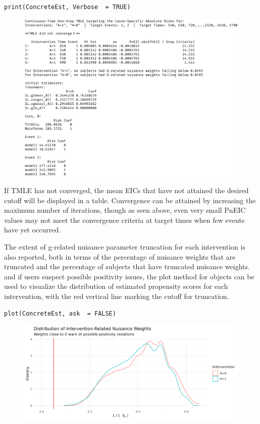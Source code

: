 \documentclass{report}
\newcommand{\1}{\ensuremath{\mathbf{1}}}
\begin{document}
\begin{lstlisting}
print(ConcreteEst, Verbose  = TRUE)
\end{lstlisting}

\begin{figure}[H]
\center
\includegraphics[width=\linewidth]{fig/ConcreteEst.png}
\end{figure}

If TMLE has not converged, the mean EICs that have not attained the desired cutoff will be displayed in a table. Convergence can be attained by increasing the maximum number of iterations, though as seen above, even very small PnEIC values may not meet the convergence criteria at target times when few events have yet occurred.

The extent of g-related nuisance parameter truncation for each intervention is also reported, both in terms of the percentage of nuisance weights that are truncated and the percentage of subjects that have truncated nuisance weights. and if users suspect possible positivity issues, the plot method for  objects can be used to visualize the distribution of estimated propensity scores for each intervention, with the red vertical line marking the cutoff for truncation.

\begin{lstlisting}
plot(ConcreteEst, ask  = FALSE)
\end{lstlisting}
\begin{figure}[H]
\center
\includegraphics[width=\linewidth]{fig/ConcreteEst-PS.png}
\end{figure}
\end{document}
